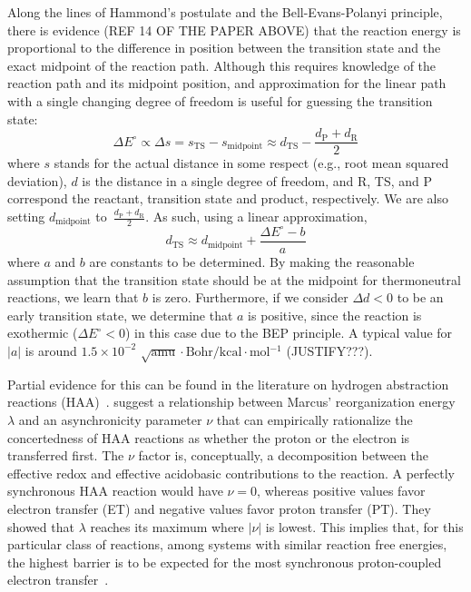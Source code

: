 Along the lines of Hammond's postulate and the Bell-Evans-Polanyi principle,
there is evidence (REF 14 OF THE PAPER ABOVE) that the reaction energy is
proportional to the difference in position between the transition state and the
exact midpoint of the reaction path.
Although this requires knowledge of the reaction path and its midpoint
position, and approximation for the linear path with a single changing degree
of freedom is useful for guessing the transition state:
%
\begin{equation}
    \Delta E^\circ \propto \Delta s
        = s_\text{TS} - s_\text{midpoint}
        \approx d_\text{TS} - \frac{d_\text{P} + d_\text{R}}{2}
\end{equation}
%
where $s$ stands for the actual distance in some respect (e.g., root mean
squared deviation), $d$ is the distance in a single degree of freedom, and R,
TS, and P correspond the reactant, transition state and product, respectively.
We are also setting $d_\text{midpoint}$
to~$\frac{d_\text{P} + d_\text{R}}{2}$.
As such, using a linear approximation,
%
\begin{equation}
    d_\text{TS}
    \approx d_\text{midpoint} + \frac{\Delta E^\circ - b}{a}
\end{equation}
%
where $a$ and $b$ are constants to be determined.
By making the reasonable assumption that the transition state should be at the
midpoint for thermoneutral reactions, we learn that $b$ is zero.
Furthermore, if we consider $\Delta d < 0$ to be an early transition state, we
determine that $a$ is positive, since the reaction is exothermic
($\Delta E^\circ < 0$) in this case due to the BEP principle.
A typical value for $|a|$ is around
$1.5 \times 10^{-2}$
$\sqrt{\text{amu}}\cdot\text{Bohr} / \text{kcal$\cdot$mol$^{-1}$}$
(JUSTIFY???).

Partial evidence for this can be found in the literature on hydrogen
abstraction reactions (HAA)~\cite{Bim2018}.
\citeauthor{Bim2018} suggest a relationship between Marcus' reorganization
energy $\lambda$ and an asynchronicity parameter $\nu$ that can empirically
rationalize the concertedness of HAA reactions as whether the proton or the
electron is transferred first.
The $\nu$ factor is, conceptually, a decomposition between the effective redox
and effective acidobasic contributions to the reaction.
A perfectly synchronous HAA reaction would have $\nu = 0$, whereas positive
values favor electron transfer (ET) and negative values favor proton transfer
(PT).
They showed that $\lambda$ reaches its maximum where $|\nu|$ is lowest.
This implies that, for this particular class of reactions, among systems with
similar reaction free energies, the highest barrier is to be expected for the
most synchronous proton-coupled electron transfer~\cite{Bim2018}.
